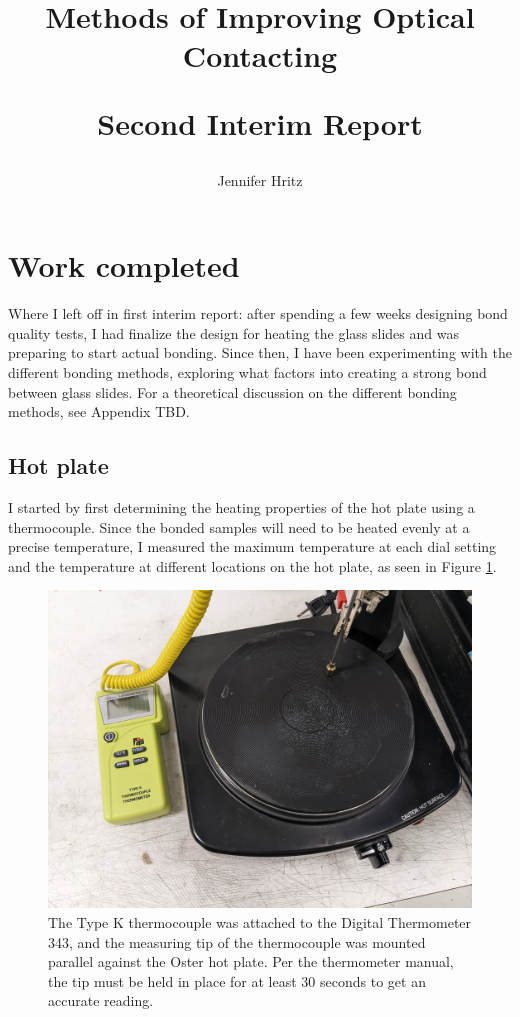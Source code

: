 \documentclass[colorlinks=true,pdfstartview=FitV,linkcolor=blue,
            citecolor=red,urlcolor=magenta]{ligodoc}
\title{Methods of Improving Optical Contacting

Second Interim Report}
\author{Jennifer Hritz}
\begin{document}
\section{Work completed}

Where I left off in first interim report: after spending a few weeks designing bond quality tests, I had finalize the design for heating the glass slides and was preparing to start actual bonding. Since then, I have been experimenting with the different bonding methods, exploring what factors into creating a strong bond between glass slides. For a theoretical discussion on the different bonding methods, see Appendix TBD.

\subsection{Hot plate}

I started by first determining the heating properties of the hot plate using a thermocouple. Since the bonded samples will need to be heated evenly at a precise temperature, I measured the maximum temperature at each dial setting and the temperature at different locations on the hot plate, as seen in Figure \ref{fig:hotplate_heat_test_setup}.

\begin{figure}[htbp]
\begin{center}
\includegraphics[width=6in]{graphics/hotplate_heat_test_setup_PXL_20220708_230032062.jpg}
\caption{The Type K thermocouple was attached to the Digital Thermometer 343, and the measuring tip of the thermocouple was mounted parallel against the Oster hot plate. Per the thermometer manual, the tip must be held in place for at least 30 seconds to get an accurate reading.}
\label{fig:hotplate_heat_test_setup}
\end{center}
\end{figure}
\end{document}
